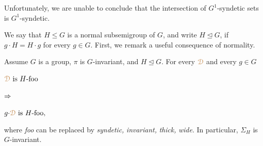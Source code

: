Unfortunately, we are unable to conclude that the intersection of $G^1$-syndetic sets is $G^1$-syndetic.

We say that $H\le G$ is a normal subsemigroup of $G$, and write $H\trianglelefteq G$, if $g{\cdot}H=H{\cdot}g$ for every $g\in G$.
First, we remark a useful consequence of normality.

\begin{remark}\label{rem_invariance_normalsubg}
\def\medrel#1{\parbox[t]{5ex}{$\displaystyle\hfil #1$}}
\def\ceq#1#2#3{\parbox[t]{20ex}{$\displaystyle #1$}\medrel{#2}{$\displaystyle #3$}}
  Assume $G$ is a group, $\pi$ is $G$-invariant, and $H\trianglelefteq G$.
  For every ${\color{brown}\EuScript D}$ and every $g\in G$\smallskip
  
  \ceq{\hfill\mrD\textrm{ is }H\textrm{-foo}}{\IMP}{g{\cdot}\mrD\textrm{ is }H\textrm{-foo},}\smallskip
  
  where \textit{foo\/} can be replaced by \textit{syndetic,} \textit{invariant,} \textit{thick,} \textit{wide.}
  In particular, $\Sigma_H$ is $G$-invariant.
\end{remark}

